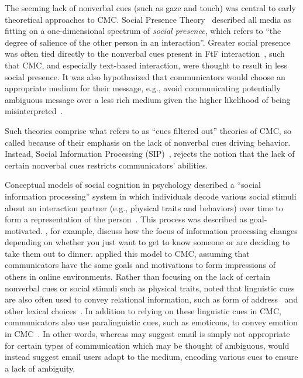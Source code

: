 \documentclass[12pt]{nuthesis}	%
\begin{document}
The seeming lack of nonverbal cues (such as gaze and touch) was central to early theoretical approaches to CMC. Social Presence Theory~\citep{short1976social} described all media as fitting on a one-dimensional spectrum of \textit{social presence}, which refers to ``the degree of salience of the other person in an interaction''. Greater social presence was often tied directly to the nonverbal cues present in FtF interaction~\citep[e.g.,][]{burgoon1984relational}, such that CMC, and especially text-based interaction, were thought to result in less social presence. It was also hypothesized that communicators would choose an appropriate medium for their message, e.g., avoid communicating potentially ambiguous message over a less rich medium given the higher likelihood of being misinterpreted~\citep{daft1986organizational}.

Such theories comprise what \citet{walther2002cues} refers to as ``cues filtered out'' theories of CMC, so called because of their emphasis on the lack of nonverbal cues driving behavior. Instead, Social Information Processing (SIP)~\citep{walther1992interpersonal}, rejects the notion that the lack of certain nonverbal cues restricts communicators' abilities. 

Conceptual models of social cognition in psychology described a ``social information processing'' system in which individuals decode various social stimuli about an interaction partner (e.g., physical traits and behaviors) over time to form a representation of the person~\citep{lord1985information}. This process was described as goal-motivated. \citet{wyer1980processing}, for example, discuss how the focus of information processing changes depending on whether you just want to get to know someone or are deciding to take them out to dinner. \citet{walther1992interpersonal} applied this model to CMC, assuming that communicators have the same goals and motivations to form impressions of others in online environments. Rather than focusing on the lack of certain nonverbal cues or social stimuli such as physical traits, \citeauthor{walther1992interpersonal} noted that linguistic cues are also often used to convey relational information, such as form of address~\citep{argyle1976gaze} and other lexical choices~\citep{wiener1968language}. In addition to relying on these linguistic cues in CMC, communicators also use paralinguistic cues, such as emoticons, to convey emotion in CMC~\citep{carey1980paralanguage,sherblom1988direction}. In other words, whereas \citet{daft1986organizational} may suggest email is simply not appropriate for certain types of communication which may be thought of ambiguous, \citeauthor{walther1992interpersonal} would instead suggest email users adapt to the medium, encoding various cues to ensure a lack of ambiguity.
\end{document}
